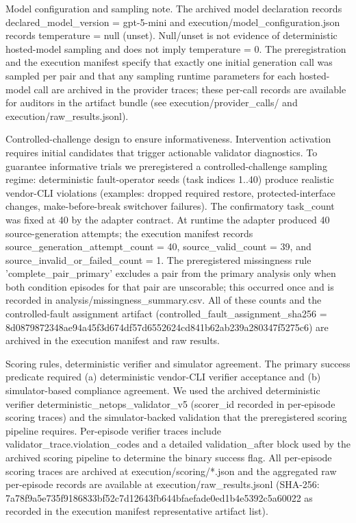 \documentclass[conference]{IEEEtran}
\begin{document}
Model configuration and sampling note. The archived model declaration records declared\_model\_version = gpt-5-mini and execution/model\_configuration.json records temperature = null (unset). Null/unset is not evidence of deterministic hosted-model sampling and does not imply temperature = 0. The preregistration and the execution manifest specify that exactly one initial generation call was sampled per pair and that any sampling runtime parameters for each hosted-model call are archived in the provider traces; these per-call records are available for auditors in the artifact bundle (see execution/provider\_calls/ and execution/raw\_results.jsonl).

Controlled-challenge design to ensure informativeness. Intervention activation requires initial candidates that trigger actionable validator diagnostics. To guarantee informative trials we preregistered a controlled-challenge sampling regime: deterministic fault-operator seeds (task indices 1..40) produce realistic vendor-CLI violations (examples: dropped required restore, protected-interface changes, make-before-break switchover failures). The confirmatory task\_count was fixed at 40 by the adapter contract. At runtime the adapter produced 40 source-generation attempts; the execution manifest records source\_generation\_attempt\_count = 40, source\_valid\_count = 39, and source\_invalid\_or\_failed\_count = 1. The preregistered missingness rule 'complete\_pair\_primary' excludes a pair from the primary analysis only when both condition episodes for that pair are unscorable; this occurred once and is recorded in analysis/missingness\_summary.csv. All of these counts and the controlled-fault assignment artifact (controlled\_fault\_assignment\_sha256 = 8d087987\allowbreak{}2348ae94\allowbreak{}a45f3d67\allowbreak{}4df57d65\allowbreak{}52624cd8\allowbreak{}41b62ab2\allowbreak{}39a28034\allowbreak{}7f5275c6) are archived in the execution manifest and raw results.

Scoring rules, deterministic verifier and simulator agreement. The primary success predicate required (a) deterministic vendor-CLI verifier acceptance and (b) simulator-based compliance agreement. We used the archived deterministic verifier deterministic\_netops\_validator\_v5 (scorer\_id recorded in per-episode scoring traces) and the simulator-backed validation that the preregistered scoring pipeline requires. Per-episode verifier traces include validator\_trace.violation\_codes and a detailed validation\_after block used by the archived scoring pipeline to determine the binary success flag. All per-episode scoring traces are archived at execution/scoring/*.json and the aggregated raw per-episode records are available at execution/raw\_results.jsonl (SHA-256: 7a78f9a5\allowbreak{}e735f918\allowbreak{}6833bf52\allowbreak{}c7d12643\allowbreak{}fb644bfa\allowbreak{}efade0ed\allowbreak{}1b4e5392\allowbreak{}c5a60022 as recorded in the execution manifest representative artifact list).
\end{document}
